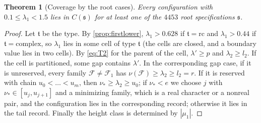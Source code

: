 \documentclass[11pt]{amsart}
\numberwithin{equation}{section}
\theoremstyle{plain}
\newtheorem{theorem}{Theorem}[section]
\theoremstyle{definition}
\theoremstyle{remark}
\newcommand{\1}{\mathbf{1}}
\begin{document}
\begin{theorem}[Coverage by the root cases]\label{thm:sourcecover}
Every configuration with $0.1\le\lambda_1<1.5$ lies in $C(\mathfrak s)$ for at least one of the $4453$
root specifications $\mathfrak s$.
\end{theorem}

\begin{proof}
Let $\mathfrak t$ be the type. By \cref{prop:firstlower}, $\lambda_1>0.628$ if $\mathfrak t=\mathrm{rc}$ and
$\lambda_1>0.44$ if $\mathfrak t=\mathrm{complex}$, so $\lambda_1$ lies in some cell of type $\mathfrak t$ (the
cells are closed, and a boundary value lies in two cells). By \eqref{eq:T2} for the parent of the
cell, $\lambda'\ge p$ and $\lambda_2\ge l_2$. If the cell is partitioned, some gap contains $\lambda'$.
In the corresponding gap case, if it is unreserved, every family $\mathcal F\ne\mathcal F_1$ has $\nu(\mathcal F)\ge\lambda_2\ge
l_2=r$. If it is reserved with chain $u_0<\dots<u_m$, then $\nu_*\ge\lambda_2\ge u_0$; if $\nu_*<e$
we choose $j$ with $\nu_*\in[u_j,u_{j+1}]$ and a minimizing family, which is a real character or a
nonreal pair, and the configuration lies in the corresponding record; otherwise it lies in the
tail record. Finally the height class is determined by $|\mu_1|$.
\end{proof}
\end{document}
